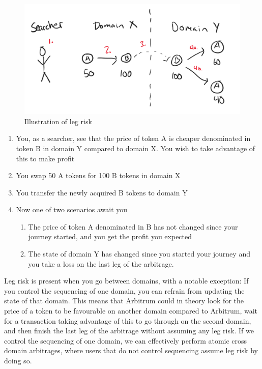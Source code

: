 \begin{figure}[H]
    \centering
    \includegraphics[width=\textwidth]{3_FIGURES/Theory/legrisk.PNG}
    \caption{Illustration of leg risk}
    \label{legrisk}
\end{figure}

\begin{enumerate}
    \item You, as a searcher, see that the price of token A is cheaper denominated in token B in domain Y compared to domain X. You wish to take advantage of this to make profit
    \item You swap 50 A tokens for 100 B tokens in domain X
    \item You transfer the newly acquired B tokens to domain Y
    \item Now one of two scenarios await you
    \begin{enumerate}[label=\alph*]
        \item The price of token A denominated in B has not changed since your journey started, and you get the profit you expected
        \item The state of domain Y has changed since you started your journey and you take a loss on the last leg of the arbitrage.
    \end{enumerate}
\end{enumerate}

Leg risk is present when you go between domains, with a notable exception: If you control the sequencing of one domain, you can refrain from updating the state of that domain. This means that Arbitrum could in theory look for the price of a token to be favourable on another domain compared to Arbitrum, wait for a transaction taking advantage of this to go through on the second domain, and then finish the last leg of the arbitrage without assuming any leg risk. If we control the sequencing of one domain, we can effectively perform atomic cross domain arbitrages, where users that do not control sequencing assume leg risk by doing so. 

